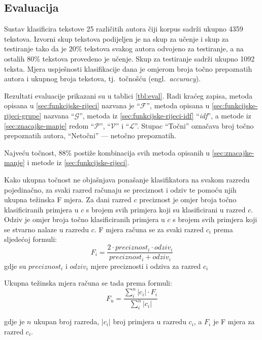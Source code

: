 \documentclass[11pt,english]{article}
\newcommand{\engl}[1]{(engl.~\emph{#1})}
\begin{document}
\begin{multicols}{2}
\section{Evaluacija}
\label{sec:evaluacija}
Sustav klasificira tekstove 25 različitih autora čiji korpus sadrži ukupno 4359
tekstova. Izvorni skup tekstova podijeljen je na skup za učenje i skup za testiranje
tako da je $20\%$ tekstova svakog autora odvojeno za testiranje, a na
ostalih $80\%$ tekstova provedeno je učenje. Skup za testiranje sadrži
ukupno 1092 teksta. Mjera uspješnosti klasifikacije dana je omjerom broja točno
prepoznatih autora i ukupnog broja tekstova, tj.~točnošću \engl{accuracy}.

Rezultati evaluacije prikazani su u tablici \ref{tbl:eval}. Radi kraćeg zapisa,
metoda opisana u \ref{sec:funkcijske-rijeci} nazvana je ``$\mathcal{F}$'', metoda
opisana u \ref{sec:funkcijske-rijeci-grupe} nazvana ``$\mathcal{G}$'',
metoda iz \ref{sec:funkcijske-rijeci-idf} ``\emph{idf}'', a metode iz
\ref{sec:znacajke-manje} redom ``$\mathcal{P}$'', ``$\mathcal{V}$'' i
``$\mathcal{L}$''. Stupac ``Točni'' označava broj točno prepoznatih autora,
``Netočni'' --- netočno prepoznatih.

Najveću točnost, 88\% postiže kombinacija svih metoda opisanih u
\ref{sec:znacajke-manje} i metode iz \ref{sec:funkcijske-rijeci}.

Kako ukupna točnost ne objašnjava ponašanje klasifikatora na svakom razredu
pojedinačno, za svaki razred računaju se preciznost i odziv te pomoću njih
ukupna težinska F mjera. Za dani razred $c$ preciznost je omjer broja točno
klasificiranih primjera u $c$ s brojem svih primjera koji su klasificirani u
razred $c$. Odziv je omjer broja točno klasificiranih primjera u $c$ s brojem
svih primjera koji se stvarno nalaze u razredu $c$. F mjera računa se za svaki
razred $c_i$ prema sljedećoj formuli:
\begin{equation}
F_i = \frac{2 \cdot preciznost_i \cdot odziv_i}{preciznost_i + odziv_i}
\end{equation}
gdje su $preciznost_i$ i $odziv_i$ mjere preciznosti i odziva za razred $c_i$

Ukupna težinska mjera računa se tada prema formuli:
\begin{equation}
F_u = \frac{\sum^{n}_i |c_i|\cdot F_i}{\sum^n_i|c_i|}
\end{equation}

gdje je $n$ ukupan broj razreda, $|c_i|$ broj primjera u razredu $c_i$, a $F_i$
je F mjera za razred $c_i$.


\end{multicols}
\end{document}
